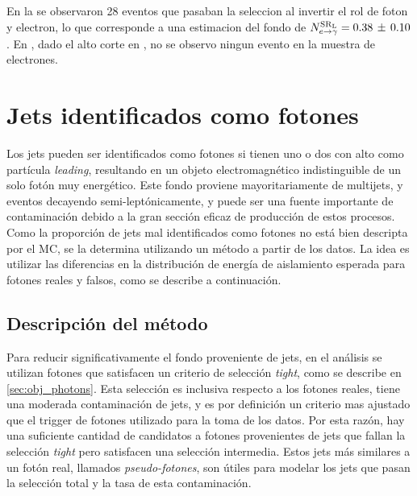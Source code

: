 En la {\SRL} se observaron 28 eventos que pasaban la seleccion al invertir el
rol de foton y electron, lo que corresponde a una estimacion del fondo de
$N^{\mathrm{SR}_\mathrm{L}}_{e\rightarrow\gamma} = 0.38\, \pm\, 0.10$. En {\SRH}, dado el alto corte en
{\met}, no se observo ningun evento en la muestra de electrones.



\section{Jets identificados como fotones}
\label{sec:jfakes}

Los jets pueden ser identificados como fotones si tienen uno o dos {\pizero} con
alto {\pt} como partícula \emph{leading}, resultando en un objeto electromagnético
indistinguible de un solo fotón muy energético. Este fondo proviene
mayoritariamente de multijets, {\wjets} y eventos {\ttbar} decayendo
semi-leptónicamente, y puede ser una fuente importante de contaminación debido a
la gran sección eficaz de producción de estos procesos. Como la proporción de
jets mal identificados como fotones no está bien descripta por el MC, se la
determina utilizando un método a partir de los datos. La idea es utilizar las
diferencias en la distribución de energía de aislamiento esperada para fotones
reales y falsos, como se describe a continuación.

\subsection{Descripción del método}

Para reducir significativamente el fondo proveniente de jets, en el análisis
se utilizan fotones que satisfacen un criterio de selección \emph{tight}, como se
describe en \cref{sec:obj_photons}. Esta selección es inclusiva respecto a los
fotones reales, tiene una moderada contaminación de jets, y es por definición un
criterio mas ajustado que el trigger de fotones utilizado para la toma de los
datos. Por esta razón, hay una suficiente cantidad de candidatos a fotones provenientes de jets
que fallan la selección \emph{tight} pero satisfacen una selección
intermedia. Estos jets más similares a un fotón real, llamados
\emph{pseudo-fotones}, son útiles para modelar los jets que pasan la selección
total y la tasa de esta contaminación.


